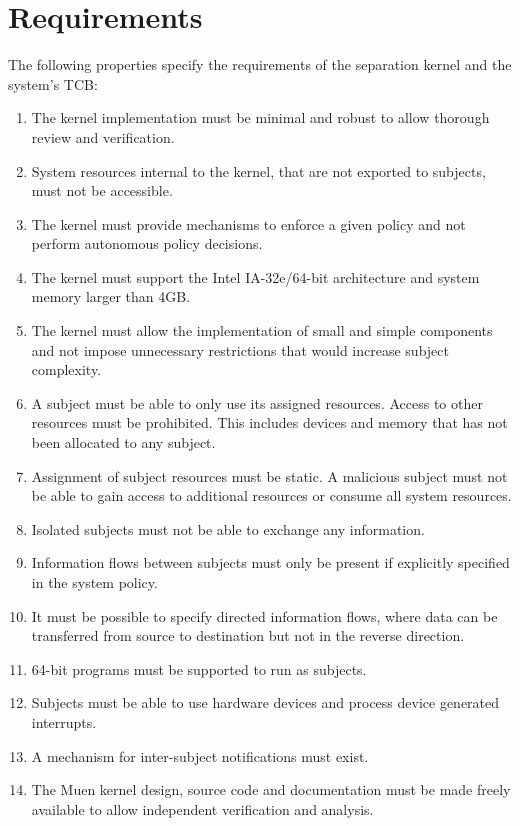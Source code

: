 \section{Requirements}\label{sec:requirements}

The following properties specify the requirements of the separation kernel and
the system's TCB:
\begin{enumerate}
	\item The kernel implementation must be minimal and robust to allow thorough
		review and verification.
	\item System resources internal to the kernel, that are not exported to
		subjects, must not be accessible.
	\item The kernel must provide mechanisms to enforce a given policy and not
		perform autonomous policy decisions.
	\item The kernel must support the Intel IA-32e/64-bit architecture and
		system memory larger than 4GB.
	\item The kernel must allow the implementation of small and simple
		components and not impose unnecessary restrictions that would increase
		subject complexity.
	\item A subject must be able to only use its assigned resources. Access to
		other resources must be prohibited. This includes devices and memory
		that has not been allocated to any subject.
	\item Assignment of subject resources must be static. A malicious subject
		must not be able to gain access to additional resources or consume all
		system resources.
	\item Isolated subjects must not be able to exchange any information.
	\item Information flows between subjects must only be present if explicitly
		specified in the system policy.
	\item It must be possible to specify directed information flows, where data
		can be transferred from source to destination but not in the reverse
		direction.
	\item 64-bit programs must be supported to run as subjects.
	\item Subjects must be able to use hardware devices and process device
		generated interrupts.
	\item A mechanism for inter-subject notifications must exist.
	\item The Muen kernel design, source code and documentation must be made
		freely available to allow independent verification and analysis.
\end{enumerate}
